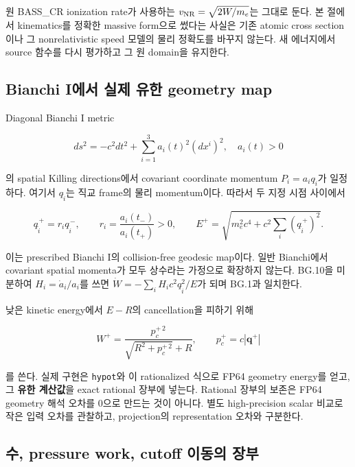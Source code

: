\documentclass[11pt,a4paper]{article}
\begin{document}
원 BASS\_CR ionization rate가 사용하는 \(v_{\rm NR}=\sqrt{2W/m_e}\)는 그대로 둔다. 본 절에서 kinematics를 정확한 massive form으로 썼다는 사실은 기존 atomic cross section이나 그 nonrelativistic speed 모델의 물리 정확도를 바꾸지 않는다. 새 에너지에서 source 함수를 다시 평가하고 그 원 domain을 유지한다.

\hypertarget{bianchi-iuxc5d0uxc11c-uxc2e4uxc81c-uxc720uxd55c-geometry-map}{%
\subsection{Bianchi I에서 실제 유한 geometry map}\label{bianchi-iuxc5d0uxc11c-uxc2e4uxc81c-uxc720uxd55c-geometry-map}}

Diagonal Bianchi I metric

\[ds^2=-c^2dt^2+\sum_{i=1}^3 a_i(t)^2(dx^i)^2,\quad a_i(t)>0\tag{BG.9}\]

의 spatial Killing directions에서 covariant coordinate momentum \(P_i=a_iq_{\hat i}\)가 일정하다. 여기서 \(q_{\hat i}\)는 직교 frame의 물리 momentum이다. 따라서 두 지정 시점 사이에서

\[q_{\hat i}^{\,+}=r_iq_{\hat i}^{\,-},\qquad r_i=\frac{a_i(t_-)}{a_i(t_+)}>0,\qquad
E^+=\sqrt{m_e^2c^4+c^2\sum_i(q_{\hat i}^{\,+})^2}.\tag{BG.10}\]

이는 prescribed Bianchi I의 collision-free geodesic map이다. 일반 Bianchi에서 covariant spatial momenta가 모두 상수라는 가정으로 확장하지 않는다. BG.10을 미분하여 \(H_i=\dot a_i/a_i\)를 쓰면 \(\dot W=-\sum_iH_i c^2q_{\hat i}^2/E\)가 되며 BG.1과 일치한다.

낮은 kinetic energy에서 \(E-R\)의 cancellation을 피하기 위해

\[W^+=\frac{p_c^{+\,2}}{\sqrt{R^2+p_c^{+\,2}}+R},\qquad p_c^+=c|\mathbf q^+|\tag{BG.11}\]

를 쓴다. 실제 구현은 \texttt{hypot}와 이 rationalized 식으로 FP64 geometry energy를 얻고, 그 \textbf{유한 계산값}을 exact rational 장부에 넣는다. Rational 장부의 보존은 FP64 geometry 해석 오차를 0으로 만드는 것이 아니다. 별도 high-precision scalar 비교로 작은 입력 오차를 관찰하고, projection의 representation 오차와 구분한다.

\hypertarget{uxc218-pressure-work-cutoff-uxc774uxb3d9uxc758-uxc7a5uxbd80}{%
\subsection{수, pressure work, cutoff 이동의 장부}\label{uxc218-pressure-work-cutoff-uxc774uxb3d9uxc758-uxc7a5uxbd80}}
\end{document}
